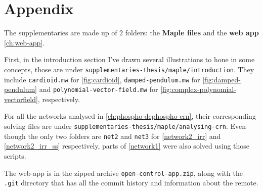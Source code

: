 \chapter*{Appendix}\label{appendix}
The supplementaries are made up of $2$ folders: the \textbf{Maple files} and the \textbf{web app} \ref{ch:web-app}.

First, in the introduction section I've drawn several illustrations to hone in some concepts, those are under \verb|supplementaries-thesis/maple/introduction|. They include \verb|cardioid.mw| for \ref{fig:cardioid}, \verb|damped-pendulum.mw| for \ref{fig:damped-pendulum} and \verb|polynomial-vector-field.mw| for \ref{fig:complex-polynomial-vectorfield}, respectively.

For all the networks analysed in \ref{ch:phospho-dephospho-crn}, their corresponding solving files are under \verb|supplementaries-thesis/maple/analysing-crn|. Even though the only two folders are \verb|net2| and \verb|net3| for \ref{network2_irr} and \ref{network2_irr_ss} respectively, parts of \ref{network1} were also solved using those scripts.

The web-app is in the zipped archive \verb|open-control-app.zip|, along with the \verb|.git| directory that has all the commit history and information about the remote.